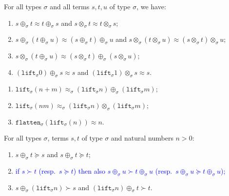 \documentclass[a4paper,UKenglish,cleveref,autoref,numberwithinsect]{lipics-v2019}
\theoremstyle{definition}
\newcommand{\flatten}{\mathtt{flatten}}
\newcommand{\lift}{\mathtt{lift}}
\newcommand{\CKchange}[1]{\textcolor{blue}{#1}}
\begin{document}
\begin{lemma}\label{lem:approxproperties}
For all types $\sigma$ and all terms $s,t,u$ of type $\sigma$, we
have:
\begin{enumerate}
\item\label{lem:approx:symmetry} $s \oplus_\sigma t \approx t
  \oplus_\sigma s$ and $s \otimes_\sigma t \approx t \otimes_\sigma
  s$;
\item\label{lem:approx:assoc} $s \oplus_\sigma (t \oplus_\sigma u)
  \approx (s \oplus_\sigma t) \oplus_\sigma u$ and $s \otimes_\sigma
  (t \otimes_\sigma u) \approx (s \otimes_\sigma t) \otimes_\sigma u$;
\item\label{lem:approx:distribution} $s \otimes_\sigma (t
  \oplus_\sigma u) \approx (s \otimes_\sigma t) \oplus_\sigma (s
  \otimes_\sigma u)$;
\item\label{lem:approx:neutral} $(\lift_\sigma 0) \oplus_\sigma s
  \approx s$ and $(\lift_\sigma 1) \otimes_\sigma s \approx s$.
\end{enumerate}
\end{lemma}

\begin{lemma}\label{lem_lift_approx}
  \begin{enumerate}
  \item\label{lem_lift_approx:plussplit}
    $\lift_\sigma(n+m) \approx_\sigma (\lift_\sigma n)
    \oplus_\sigma (\lift_\sigma m)$;
  \item $\lift_\sigma(n m) \approx_\sigma (\lift_\sigma n)
    \otimes_\sigma (\lift_\sigma m)$;
  \item $\flatten_\sigma(\lift_\sigma(n)) \approx n$.
  \end{enumerate}
\end{lemma}

\begin{lemma}\label{lem:plusparts}
For all types $\sigma$, terms $s,t$ of type $\sigma$ and natural
numbers $n > 0$:
\begin{enumerate}
\item\label{lem:plusparts:removefromsucceq}
  $s \oplus_{\sigma} t \succeq s$ and $s \oplus_{\sigma} t \succeq
  t$;
\item \CKchange{if $s \succ t$ (resp.~$s \succeq t$) then also
  $s \oplus_{\sigma} u \succ t \oplus_{\sigma} u$ (resp.~$s \oplus_{
  \sigma} u \succeq t \oplus_{\sigma} u$);}
\item $s \oplus_{\sigma} (\lift_{\sigma} n) \succ s$ and
  $(\lift_{\sigma} n) \oplus_{\sigma} t \succ t$.
\end{enumerate}
\end{lemma}
\end{document}
